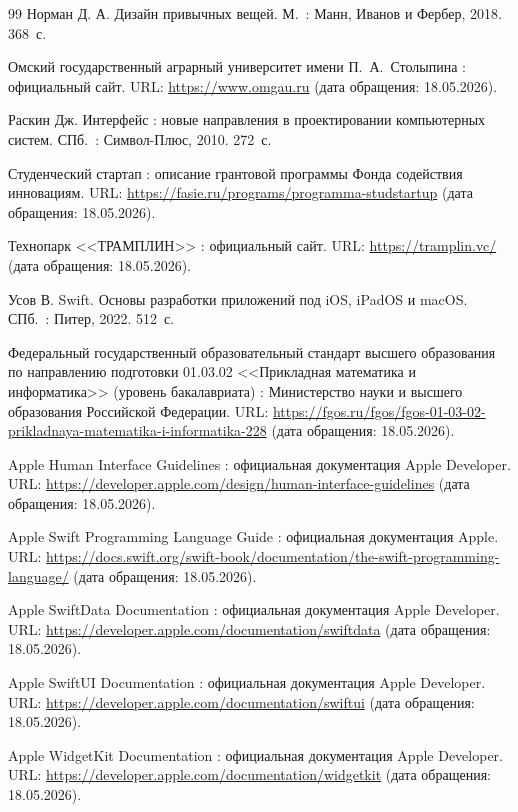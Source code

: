 \begin{thebibliography}{99}
   Норман Д. А. Дизайн привычных вещей. М.~: Манн, Иванов и Фербер, 2018. 368~с.

   Омский государственный аграрный университет имени П.~А.~Столыпина : официальный сайт. URL: \url{https://www.omgau.ru} (дата обращения: 18.05.2026).

   Раскин Дж. Интерфейс : новые направления в проектировании компьютерных систем. СПб.~: Символ-Плюс, 2010. 272~с.

   Студенческий стартап : описание грантовой программы Фонда содействия инновациям. URL: \url{https://fasie.ru/programs/programma-studstartup} (дата обращения: 18.05.2026).

   Технопарк <<ТРАМПЛИН>> : официальный сайт. URL: \url{https://tramplin.vc/} (дата обращения: 18.05.2026).

   Усов В. Swift. Основы разработки приложений под iOS, iPadOS и macOS. СПб.~: Питер, 2022. 512~с.

   Федеральный государственный образовательный стандарт высшего образования по направлению подготовки 01.03.02 <<Прикладная математика и информатика>> (уровень бакалавриата) : Министерство науки и высшего образования Российской Федерации. URL: \url{https://fgos.ru/fgos/fgos-01-03-02-prikladnaya-matematika-i-informatika-228} (дата обращения: 18.05.2026).

   Apple Human Interface Guidelines : официальная документация Apple Developer. URL: \url{https://developer.apple.com/design/human-interface-guidelines} (дата обращения: 18.05.2026).

   Apple Swift Programming Language Guide : официальная документация Apple. URL: \url{https://docs.swift.org/swift-book/documentation/the-swift-programming-language/} (дата обращения: 18.05.2026).

   Apple SwiftData Documentation : официальная документация Apple Developer. URL: \url{https://developer.apple.com/documentation/swiftdata} (дата обращения: 18.05.2026).

   Apple SwiftUI Documentation : официальная документация Apple Developer. URL: \url{https://developer.apple.com/documentation/swiftui} (дата обращения: 18.05.2026).

   Apple WidgetKit Documentation : официальная документация Apple Developer. URL: \url{https://developer.apple.com/documentation/widgetkit} (дата обращения: 18.05.2026).


\end{thebibliography}
